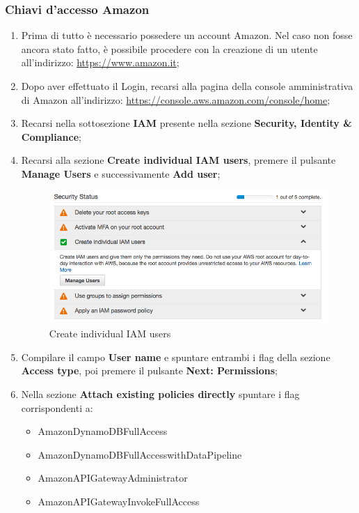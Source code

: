 \documentclass[../ManualeSviluppatore_v1.0.0.tex]{subfiles}
\begin{document}
		\subsubsection{Chiavi d'accesso Amazon}
			\begin{enumerate}
			\item Prima di tutto è necessario possedere un account Amazon. Nel caso non fosse ancora stato fatto, è possibile procedere con la creazione di un utente all'indirizzo: \url{https://www.amazon.it};
			\item Dopo aver effettuato il Login, recarsi alla pagina della console amministrativa di Amazon all'indirizzo: \url{https://console.aws.amazon.com/console/home};
			\item Recarsi nella sottosezione \textbf{IAM} presente nella sezione \textbf{Security, Identity \& Compliance};
			\item Recarsi alla sezione \textbf{Create individual IAM users}, premere il pulsante \textbf{Manage Users} e successivamente \textbf{Add user};
			\begin{figure}[!h]
				\centering
				\includegraphics[scale=0.45]{Screenshot/IAMusers.png}
				\caption{Create individual IAM users}
			\end{figure}
			\item Compilare il campo \textbf{User name} e spuntare entrambi i flag della sezione \textbf{Access type}, poi premere il pulsante \textbf{Next: Permissions};
			\item Nella sezione \textbf{Attach existing policies directly} spuntare i flag corrispondenti a:
				\begin{itemize}
					\item AmazonDynamoDBFullAccess
					\item AmazonDynamoDBFullAccesswithDataPipeline
					\item AmazonAPIGatewayAdministrator
					\item AmazonAPIGatewayInvokeFullAccess

\end{itemize}
\end{enumerate}
\end{document}

